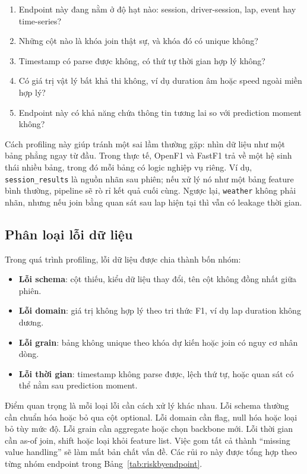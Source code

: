 \documentclass[conference]{IEEEtran}
\begin{document}
\begin{enumerate}
    \item Endpoint này đang nằm ở độ hạt nào: session, driver-session, lap, event hay time-series?
    \item Những cột nào là khóa join thật sự, và khóa đó có unique không?
    \item Timestamp có parse được không, có thứ tự thời gian hợp lý không?
    \item Có giá trị vật lý bất khả thi không, ví dụ duration âm hoặc speed ngoài miền hợp lý?
    \item Endpoint này có khả năng chứa thông tin tương lai so với prediction moment không?
\end{enumerate}

Cách profiling này giúp tránh một sai lầm thường gặp: nhìn dữ liệu như một bảng phẳng ngay từ đầu. Trong thực tế, OpenF1 và FastF1 trả về một hệ sinh thái nhiều bảng, trong đó mỗi bảng có logic nghiệp vụ riêng. Ví dụ, \texttt{session\_results} là nguồn nhãn sau phiên; nếu xử lý nó như một bảng feature bình thường, pipeline sẽ rò rỉ kết quả cuối cùng. Ngược lại, \texttt{weather} không phải nhãn, nhưng nếu join bằng quan sát sau lap hiện tại thì vẫn có leakage thời gian.

\subsection{Phân loại lỗi dữ liệu}
Trong quá trình profiling, lỗi dữ liệu được chia thành bốn nhóm:

\begin{itemize}
    \item \textbf{Lỗi schema}: cột thiếu, kiểu dữ liệu thay đổi, tên cột không đồng nhất giữa phiên.
    \item \textbf{Lỗi domain}: giá trị không hợp lý theo tri thức F1, ví dụ lap duration không dương.
    \item \textbf{Lỗi grain}: bảng không unique theo khóa dự kiến hoặc join có nguy cơ nhân dòng.
    \item \textbf{Lỗi thời gian}: timestamp không parse được, lệch thứ tự, hoặc quan sát có thể nằm sau prediction moment.
\end{itemize}

Điểm quan trọng là mỗi loại lỗi cần cách xử lý khác nhau. Lỗi schema thường cần chuẩn hóa hoặc bỏ qua cột optional. Lỗi domain cần flag, null hóa hoặc loại bỏ tùy mức độ. Lỗi grain cần aggregate hoặc chọn backbone mới. Lỗi thời gian cần as-of join, shift hoặc loại khỏi feature list. Việc gom tất cả thành ``missing value handling'' sẽ làm mất bản chất vấn đề. Các rủi ro này được tổng hợp theo từng nhóm endpoint trong Bảng~\ref{tab:riskbyendpoint}.
\end{document}
